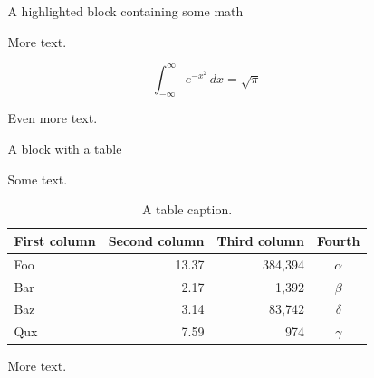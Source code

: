 \documentclass[final]{beamer}
\newlength{\sepwidth}
\newlength{\colwidth}
\newcommand{\separatorcolumn}{\begin{column}{\sepwidth}\end{column}}
\begin{document}
\begin{frame}[t]
\begin{columns}[t]
        \separatorcolumn

        \begin{column}{\colwidth}

            \begin{exampleblock}{A highlighted block containing some math}
            
                More text.
            
                \[
                    \int_{-\infty}^{\infty} e^{-x^2}\,dx = \sqrt{\pi}
                \]
            
                Even more text.
            
            
                \lipsum[1]
            
            
                \lipsum[1]
            
            \end{exampleblock}
            
            \begin{block}{A block with a table}
            
                Some text.
            
                \begin{table}
                    \centering
                    \begin{tabular}{l r r c}
                        \toprule
                        \textbf{First column} & \textbf{Second column} & \textbf{Third column} & \textbf{Fourth} \\
                        \midrule
                        Foo & 13.37 & 384,394 & $\alpha$ \\
                        Bar & 2.17 & 1,392 & $\beta$ \\
                        Baz & 3.14 & 83,742 & $\delta$ \\
                        Qux & 7.59 & 974 & $\gamma$ \\
                        \bottomrule
                    \end{tabular}
                    \caption{A table caption.}
                \end{table}
            
                More text.
            
            \end{block}


\end{column}
\end{columns}
\end{frame}
\end{document}
